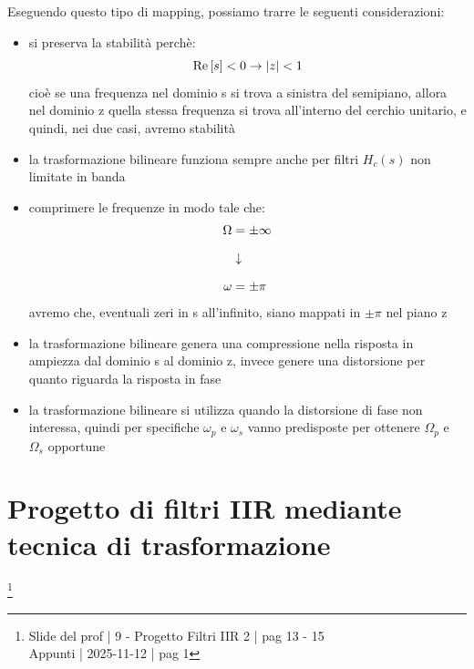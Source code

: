 Eseguendo questo tipo di mapping, possiamo trarre le seguenti considerazioni: 

\begin{itemize}
    \item si preserva la stabilità perchè: 
    {
        \Large 
        \begin{equation}
            \Re \left[s\right] < 0 \to \abs{z} < 1
        \end{equation}
    }
    cioè se una frequenza nel dominio s si trova a sinistra del semipiano, allora nel dominio z quella stessa frequenza si trova all'interno del cerchio unitario, e quindi, nei due casi, avremo stabilità 
    \item la trasformazione bilineare funziona sempre anche per filtri $H_c \left(s\right)$ non limitate in banda 
    \item comprimere le frequenze in modo tale che: 
    {
        \Large 
        \begin{equation}
            \setlength{\jot}{10pt} %
            \begin{split}
            \Omega &= \pm \infty 
            \\
            &\downarrow 
            \\
            \omega &= \pm \pi
            \end{split}
        \end{equation}
    } 
    avremo che, eventuali zeri in s all'infinito, siano mappati in $\pm \pi$ nel piano z 
    \item la trasformazione bilineare genera una compressione nella risposta in ampiezza dal dominio s al dominio z, invece genere una distorsione per quanto riguarda la risposta in fase 
    \item la trasformazione bilineare si utilizza quando la distorsione di fase non interessa, quindi per specifiche $\omega_p$ e $\omega_s$ vanno predisposte per ottenere $\Omega_p$ e $\Omega_s$ opportune
\end{itemize}

\newpage 

\section{Progetto di filtri IIR mediante tecnica di trasformazione}

\footnote{ 
    Slide del prof | 9 - Progetto Filtri IIR 2 | pag 13 - 15\\ 
    Appunti | 2025-11-12 | pag 1  
} 

